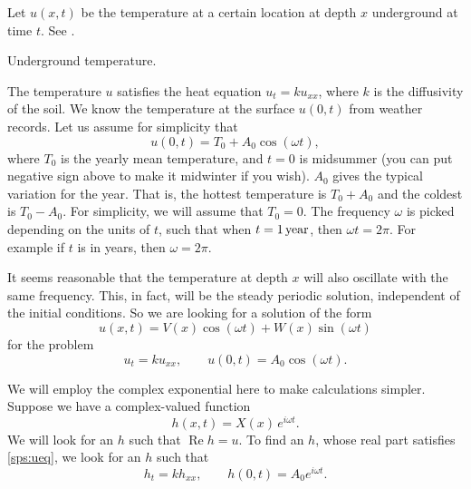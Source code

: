 Let $u(x,t)$ be the temperature at a certain location at depth $x$
underground at time $t$.  See .

\begin{mywrapfig}{2.65in}
\capstart
{}
\caption{Underground temperature.\label{sps:groundtempfig}}
\end{mywrapfig}

The temperature $u$ satisfies the heat equation $u_t = ku_{xx}$, where $k$
is the diffusivity of the soil.
We know the temperature at the surface $u(0,t)$ from weather
records.  Let us assume for simplicity that
\begin{equation*}
u(0,t) = T_0 + A_0 \cos (\omega t) ,
\end{equation*}
where $T_0$ is the yearly mean
temperature, and
$t=0$ is midsummer (you can put
negative sign above to make it midwinter if you wish).  $A_0$ gives 
the typical variation for the year.  That is,
the hottest temperature is $T_0 + A_0$ and the coldest is $T_0 - A_0$.
For simplicity, we will assume that $T_0 = 0$.
The frequency $\omega$ is picked depending on the units of $t$, such that
when $t=\unit[1]{year}$, then $\omega t = 2 \pi$.  For example if $t$ is
in years, then $\omega = 2\pi$.

It seems reasonable that the temperature at depth $x$ will also oscillate
with the same frequency.  This, in fact, will be the steady periodic
solution, independent of the initial conditions.
So we are looking for a solution of the form
\begin{equation*}
u(x,t) = V(x) \cos (\omega t) + W (x) \sin ( \omega t)
\end{equation*}
for the problem
\begin{equation} \label{sps:ueq}
u_t = k u_{xx}, \qquad u(0,t) = A_0 \cos ( \omega t) .
\end{equation}

We will employ the complex exponential here to make calculations simpler.
Suppose we have a complex-valued function
\begin{equation*}
h(x,t) = X(x)\, e^{i\omega t} .
\end{equation*}
We will look for an $h$ such that $\operatorname{Re} h = u$.
To find an $h$, whose real part satisfies \eqref{sps:ueq}, we look for
an $h$ such that
\begin{equation} \label{sps:heq}
h_t = k h_{xx}, \qquad h(0,t) = A_0 e^{i\omega t} .
\end{equation}

